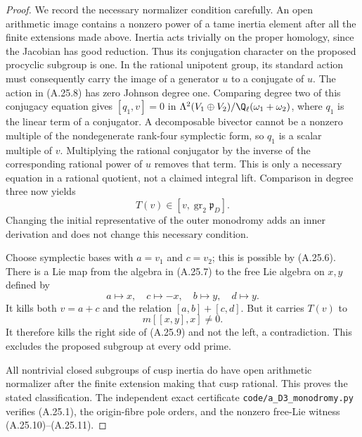 \begin{proof}
We record the necessary normalizer condition
carefully. An open arithmetic image contains a
nonzero power of a tame inertia element after all
the finite extensions made above. Inertia acts
trivially on the proper homology, since the
Jacobian has good reduction. Thus its conjugation
character on the proposed procyclic subgroup is
one. In the rational unipotent group, its standard
action must consequently carry the image of a
generator $u$ to a conjugate of $u$.
The action in (A.25.8) has zero Johnson degree one.
Comparing degree two of this conjugacy equation
gives $[q_1,v]=0$ in
$\Lambda^2(V_1\oplus V_2)/\Q_\ell(\omega_1+\omega_2)$,
where $q_1$ is the linear term of a conjugator.
A decomposable bivector cannot be a nonzero
multiple of the nondegenerate rank-four symplectic
form, so $q_1$ is a scalar multiple of $v$.
Multiplying the rational conjugator by the inverse
of the corresponding rational power of $u$ removes
that term. This is only a necessary equation in a
rational quotient, not a claimed integral lift.
Comparison in degree three now yields
\[
            T(v)\in[v,\operatorname{gr}_2\mathfrak p_D].
                                                        \tag{A.25.9}
\]
Changing the initial representative of the outer
monodromy adds an inner derivation and does not
change this necessary condition.

Choose symplectic bases with $a=v_1$ and $c=v_2$;
this is possible by (A.25.6). There is a Lie map
from the algebra in (A.25.7) to the free Lie
algebra on $x,y$ defined by
\[
                 a\mapsto x,\quad c\mapsto-x,\quad
                 b\mapsto y,\quad d\mapsto y.
                                                        \tag{A.25.10}
\]
It kills both $v=a+c$ and the relation
$[a,b]+[c,d]$. But it carries $T(v)$ to
\[
                          m[[x,y],x]\ne0.
                                                        \tag{A.25.11}
\]
It therefore kills the right side of (A.25.9)
and not the left, a contradiction. This excludes
the proposed subgroup at every odd prime.

All nontrivial closed subgroups of cusp inertia
do have open arithmetic normalizer after the
finite extension making that cusp rational.
This proves the stated classification. The
independent exact certificate
\texttt{code/a\_D3\_monodromy.py} verifies (A.25.1),
the origin-fibre pole orders, and the nonzero
free-Lie witness (A.25.10)--(A.25.11).
\end{proof}

